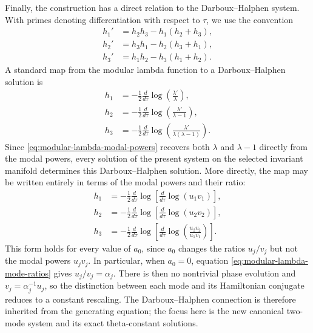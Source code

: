 \documentclass[11pt,a4paper]{article}
\numberwithin{equation}{section}
\begin{document}
Finally, the construction has a direct relation to the Darboux--Halphen system.
With primes denoting differentiation with respect to $\tau$, we use the convention
\begin{subequations}
\label{eq:Darboux-Halphen-system}
\begin{align}
    h_1'&=h_2h_3-h_1(h_2+h_3),\\
    h_2'&=h_3h_1-h_2(h_3+h_1),\\
    h_3'&=h_1h_2-h_3(h_1+h_2).
\end{align}
\end{subequations}
A standard map from the modular lambda function to a Darboux--Halphen solution is \cite{moralesManifoldWaysDarbouxHalphen2018}
\begin{subequations}
\label{eq:modular-lambda-DH-map}
\begin{align}
    h_1
    &=-\frac{1}{2}\frac{d}{d\tau}
    \log\left(\frac{\lambda'}{\lambda}\right),\\
    h_2
    &=-\frac{1}{2}\frac{d}{d\tau}
    \log\left(\frac{\lambda'}{\lambda-1}\right),\\
    h_3
    &=-\frac{1}{2}\frac{d}{d\tau}
    \log\left(\frac{\lambda'}{\lambda(\lambda-1)}\right).
\end{align}
\end{subequations}
Since \eqref{eq:modular-lambda-modal-powers} recovers both $\lambda$ and $\lambda-1$ directly from the modal powers, every solution of the present system on the selected invariant manifold determines this Darboux--Halphen solution.
More directly, the map may be written entirely in terms of the modal powers and their ratio:
\begin{subequations}
\label{eq:modular-mode-power-DH-map}
\begin{align}
    h_1
    &=-\frac{1}{2}\frac{d}{d\tau}
    \log\left[\frac{d}{d\tau}\log(u_1v_1)\right],\\
    h_2
    &=-\frac{1}{2}\frac{d}{d\tau}
    \log\left[\frac{d}{d\tau}\log(u_2v_2)\right],\\
    h_3
    &=-\frac{1}{2}\frac{d}{d\tau}
    \log\left[
        \frac{d}{d\tau}\log\left(\frac{u_2v_2}{u_1v_1}\right)
    \right].
\end{align}
\end{subequations}
This form holds for every value of $a_0$, since $a_0$ changes the ratios $u_j/v_j$ but not the modal powers $u_jv_j$.
In particular, when $a_0=0$, equation \eqref{eq:modular-lambda-mode-ratios} gives $u_j/v_j=\alpha_j$.
There is then no nontrivial phase evolution and $v_j=\alpha_j^{-1}u_j$, so the distinction between each mode and its Hamiltonian conjugate reduces to a constant rescaling.
The Darboux--Halphen connection is therefore inherited from the generating equation; the focus here is the new canonical two-mode system and its exact theta-constant solutions.
\end{document}
